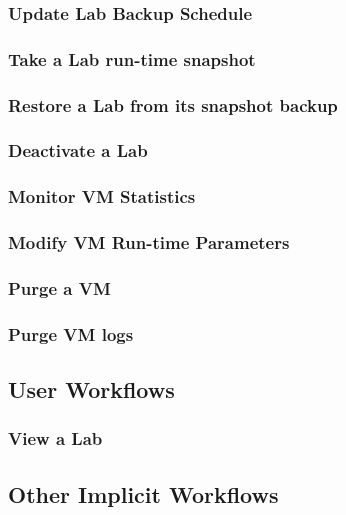 \documentclass[11pt]{article}
\begin{document}
\subsubsection{Update Lab Backup Schedule}
\label{sec-3.2.4}

\subsubsection{Take a Lab run-time snapshot}
\label{sec-3.2.5}

\subsubsection{Restore a Lab from its snapshot backup}
\label{sec-3.2.6}

\subsubsection{Deactivate a Lab}
\label{sec-3.2.7}

\subsubsection{Monitor VM Statistics}
\label{sec-3.2.8}

\subsubsection{Modify VM Run-time Parameters}
\label{sec-3.2.9}

\subsubsection{Purge a VM}
\label{sec-3.2.10}

\subsubsection{Purge VM logs}
\label{sec-3.2.11}

\subsection{User Workflows}
\label{sec-3.3}

\subsubsection{View a Lab}
\label{sec-3.3.1}

\subsection{Other Implicit Workflows}
\label{sec-3.4}
\end{document}
